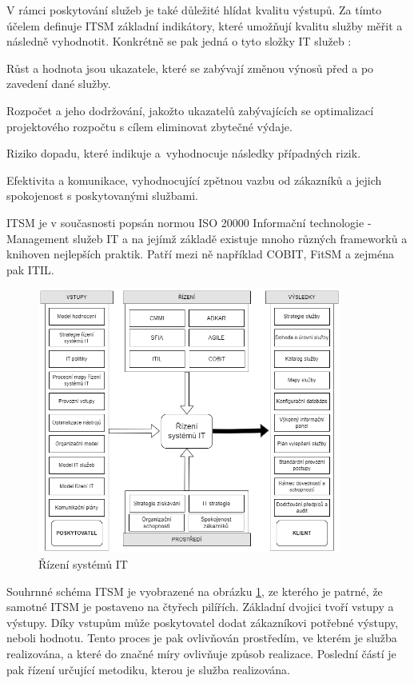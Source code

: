 \documentclass[
  digital,     %
  twoside,     %
  lof,         %
  lot,         %
]{fithesis4}
\begin{document}
V rámci poskytování služeb je také důležité hlídat kvalitu výstupů. Za tímto účelem definuje ITSM základní indikátory, které umožňují kvalitu služby měřit a následně vyhodnotit. Konkrétně se pak jedná o tyto složky IT služeb \parencite[s.~20]{Matula2017}:
\begin{compactitem}
\item Růst a hodnota jsou ukazatele, které se zabývají změnou výnosů před a po zavedení dané služby.
\item Rozpočet a jeho dodržování, jakožto ukazatelů zabývajících se optimalizací projektového rozpočtu s cílem eliminovat zbytečné výdaje.
\item Riziko dopadu, které indikuje a vyhodnocuje následky případných rizik.
\item Efektivita a komunikace, vyhodnocující zpětnou vazbu od zákazníků a jejich spokojenost s poskytovanými službami.
\end{compactitem}

ITSM je v současnosti popsán normou ISO 20000 Informační technologie - Management služeb IT a na jejímž základě existuje mnoho různých frameworků a knihoven nejlepších praktik. Patří mezi ně například COBIT, FitSM a zejména pak ITIL.\parencite[s.~25]{Matula2017}

\begin{figure}[h]
  \begin{center}
          \includegraphics[width=10cm]{img/itsm-diag.drawio.png}
  \end{center}
  \caption{Řízení systémů IT \parencite[s.~21]{Matula2017}}
  \label{fig:itsmDiag}
\end{figure} 

Souhrnné schéma ITSM je vyobrazené na obrázku \ref{fig:itsmDiag}, ze kterého je patrné, že samotné ITSM je postaveno na čtyřech pilířích. Základní dvojici tvoří vstupy a výstupy. Díky vstupům může poskytovatel dodat zákazníkovi potřebné výstupy, neboli hodnotu. Tento proces je pak ovlivňován prostředím, ve kterém je služba realizována, a které do značné míry ovlivňuje způsob realizace. Poslední částí je pak řízení určující metodiku, kterou je služba realizována. 
\end{document}
